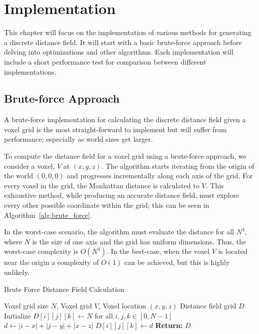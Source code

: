 \chapter{Implementation}
This chapter will focus on the implementation of various methods for generating a discrete distance field. It will start
with a basic brute-force approach before delving into optimizations and other algorithms. Each implementation will
include a short performance test for comparison between different implementations.

\section{Brute-force Approach}
A brute-force implementation for calculating the discrete distance field given a voxel grid is the most straight-forward
to implement but will suffer from performance; especially as world sizes get larger.

To compute the distance field for a voxel grid using a brute-force approach, we consider a voxel, \(V\) at
\((x, y, z)\). The algorithm starts iterating from the origin of the world \((0, 0, 0)\) and progresses incrementally
along each axis of the grid. For every voxel in the grid, the Manhattan distance is calculated to \(V\). This exhaustive
method, while producing an accurate distance field, must explore every other possible coordinate within the grid; this
can be seen in Algorithm~\ref{alg:brute_force}.

In the worst-case scenario, the algorithm must evaluate the distance for all \(N^3\), where \(N\) is the size of one
axis and the grid has uniform dimensions. Thus, the worst-case complexity is \(O(N^3)\). In the best-case, when the
voxel \(V\) is located near the origin a complexity of \(O(1)\) can be achieved, but this is highly unlikely.

\begin{algorithm}
    \caption{Brute Force Distance Field Calculation}
    \label{alg:brute_force}
    \begin{algorithmic}[1]
        \REQUIRE Voxel grid size \(N\), Voxel grid \(V\), Voxel location \((x, y, z)\)
        \ENSURE Distance field grid \(D\)
        \STATE Initialize \(D[i][j][k] \gets N\) for all \(i, j, k \in [0, N-1]\)
        \STATE \(d \gets |i - x| + |j - y| + |x - z|\) 
        \STATE \(D[i][j][k] \gets d\) 
        \ENDIF
        \ENDIF
        \ENDFOR
        \ENDFOR
        \ENDFOR
        \STATE \textbf{Return:} \(D\)
    \end{algorithmic}
\end{algorithm}

